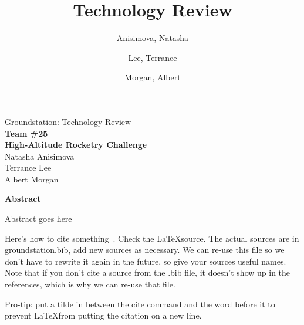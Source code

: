 \documentclass[10pt,draftclsnofoot,onecolumn]{IEEEtran}
\begin{document}
	\singlespace
	
	\title{\vspace{2in}Technology Review}
	
	\author {
		Anisimova, Natasha
		\and
		Lee, Terrance
		\and
		Morgan, Albert
	}
	
	
	\pagestyle{empty}
	\vspace*{2in}
	\begin{center}
		\huge
		Groundstation: Technology Review\\
		\normalsize
		\vspace{5mm}
		\textbf{
			Team \#25\\
			High-Altitude Rocketry Challenge\\
		}
		\vspace{1mm}
		Natasha Anisimova\\
		Terrance Lee\\
		Albert Morgan
	\end{center}
	
	\vspace{5mm}
	
	\begin{center}
		\textbf{Abstract}
	\end{center}
	
	
	Abstract goes here
	
	
	\newpage
	
	Here's how to cite something~\cite{apache-usage-statistics}.
	Check the \LaTeX source.
	The actual sources are in groundstation.bib, add new sources as necessary.
	We can re-use this file so we don't have to rewrite it again in the future, so give your sources useful names.
	Note that if you don't cite a source from the .bib file, it doesn't show up in the references, which is why we can re-use that file.
	
	Pro-tip: put a tilde in between the cite command and the word before it to prevent \LaTeX from putting the citation on a new line.

	\newpage

	\tableofcontents
	\newpage
	
	\pagestyle{headings}
\end{document}
